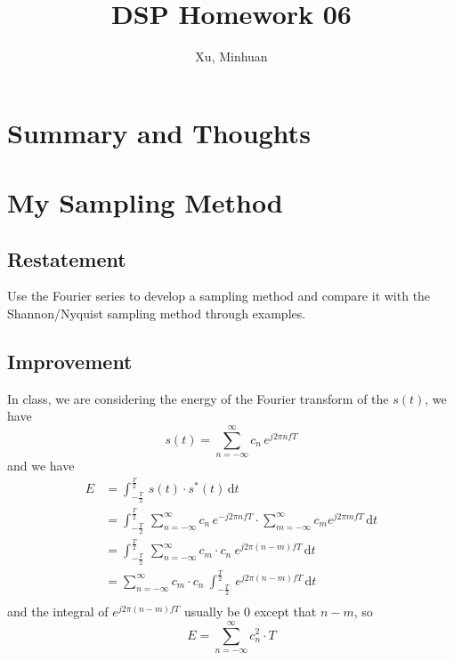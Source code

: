 \documentclass{article}
\begin{document}
\title{DSP Homework 06}
\author{Xu, Minhuan}
\maketitle
\tableofcontents
\begin{abstract}
    
\end{abstract}

\section{Summary and Thoughts}

\section{My Sampling Method}

\subsection{Restatement}
Use the Fourier series to develop a sampling method and compare it with the Shannon/Nyquist sampling method through
examples.
\subsection{Improvement}
In class, we are considering the energy of the Fourier transform of the $s(t)$, we have
\begin{equation}
s(t) = \sum_{n = -\infty}^{\infty} c_n \, e^{j2 \pi n fT}
\end{equation}
and we have
\begin{equation*}
\begin{aligned}
E &= \int_{-\frac{T}{2}}^{\frac{T}{2}} \, s(t) \cdot s^*(t) \, \mathrm{d}t \\ 
&= \int_{-\frac{T}{2}}^{\frac{T}{2}} \, \sum_{n = -\infty}^{\infty} c_n \, e^{-j2 \pi n fT} \cdot \sum_{m = -\infty}^{\infty} c_m e^{j2 \pi m fT} \, \mathrm{d}t \\ 
&= \int_{-\frac{T}{2}}^{\frac{T}{2}} \, \sum_{n = -\infty}^{\infty} c_m \cdot c_n ~ e^{j2 \pi (n - m) fT}  \, \mathrm{d}t \\ 
&= \sum_{n = -\infty}^{\infty} c_m \cdot c_n ~ \int_{-\frac{T}{2}}^{\frac{T}{2}} ~ e^{j2 \pi (n - m) fT}  \, \mathrm{d}t \\ 
\end{aligned}
\end{equation*}
and the integral of $e^{j2 \pi (n - m) fT}$ usually be $0$ except that $n - m$, so
$$
E =\sum_{n = -\infty}^{\infty} c_n^2 \cdot T
$$
\end{document}
